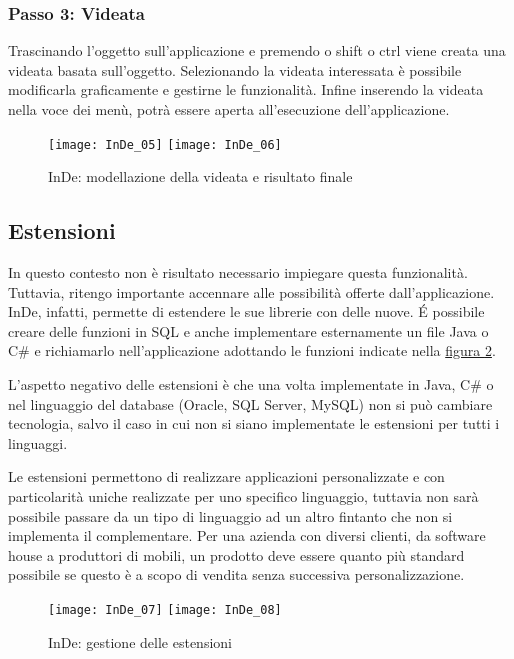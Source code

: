 \subsubsection{Passo 3: Videata}
Trascinando l'oggetto sull'applicazione e premendo o shift o ctrl viene creata una videata basata sull'oggetto. Selezionando la videata interessata è possibile modificarla graficamente e gestirne le funzionalità. Infine inserendo la videata nella voce dei menù, potrà essere aperta all'esecuzione dell'applicazione.

\begin{figure}[!h] 
	\centering  
	\texttt{[image: InDe\_05]}
	\texttt{[image: InDe\_06]}
	 
	\caption{InDe: modellazione della videata e risultato finale}
	\label{InDe_videata}
\end{figure}


\subsection{Estensioni}
In questo contesto non è risultato necessario impiegare questa funzionalità. Tuttavia, ritengo importante accennare alle possibilità offerte dall'applicazione. InDe, infatti, permette di estendere le sue librerie con delle nuove. \'E possibile creare delle funzioni in SQL e anche implementare esternamente un file Java o C\# e richiamarlo nell'applicazione adottando le funzioni indicate nella \hyperref[InDe_estensioni]{figura \ref{InDe_estensioni}}. 

L'aspetto negativo delle estensioni è che una volta implementate in Java, C\# o nel linguaggio del database (Oracle, SQL Server, MySQL) non si può cambiare tecnologia, salvo il caso in cui non si siano implementate le estensioni per tutti i linguaggi. 

Le estensioni permettono di realizzare applicazioni personalizzate e con particolarità uniche realizzate per uno specifico linguaggio, tuttavia non sarà possibile passare da un tipo di linguaggio ad un altro fintanto che non si implementa il complementare. Per una azienda con diversi clienti, da software house a produttori di mobili, un prodotto deve essere quanto più standard possibile se questo è a scopo di vendita senza successiva personalizzazione. 

\begin{figure}[!h] 
	\centering  
	\texttt{[image: InDe\_07]}
	\texttt{[image: InDe\_08]}
	\caption{InDe: gestione delle estensioni}
	\label{InDe_estensioni}
\end{figure}


